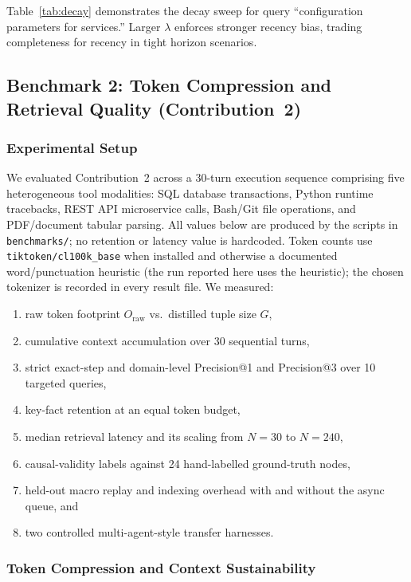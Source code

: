 \documentclass[lettersize,journal]{IEEEtran}
\begin{document}
Table~\ref{tab:decay} demonstrates the decay sweep for query ``configuration parameters for services.'' Larger $\lambda$ enforces stronger recency bias, trading completeness for recency in tight horizon scenarios.

\subsection{Benchmark 2: Token Compression and Retrieval Quality (Contribution~2)}

\subsubsection{Experimental Setup}
We evaluated Contribution~2 across a 30-turn execution sequence comprising five heterogeneous tool modalities: SQL database transactions, Python runtime tracebacks, REST API microservice calls, Bash/Git file operations, and PDF/document tabular parsing. All values below are produced by the scripts in \texttt{benchmarks/}; no retention or latency value is hardcoded. Token counts use \texttt{tiktoken/cl100k\_base} when installed and otherwise a documented word/punctuation heuristic (the run reported here uses the heuristic); the chosen tokenizer is recorded in every result file. We measured:
\begin{enumerate}
    \item raw token footprint $O_{\text{raw}}$ vs.\ distilled tuple size $G$,
    \item cumulative context accumulation over 30 sequential turns,
    \item strict exact-step and domain-level Precision@1 and Precision@3 over 10 targeted queries,
    \item key-fact retention at an equal token budget,
    \item median retrieval latency and its scaling from $N=30$ to $N=240$,
    \item causal-validity labels against 24 hand-labelled ground-truth nodes,
    \item held-out macro replay and indexing overhead with and without the async queue, and
    \item two controlled multi-agent-style transfer harnesses.
\end{enumerate}

\subsubsection{Token Compression and Context Sustainability}
\end{document}

